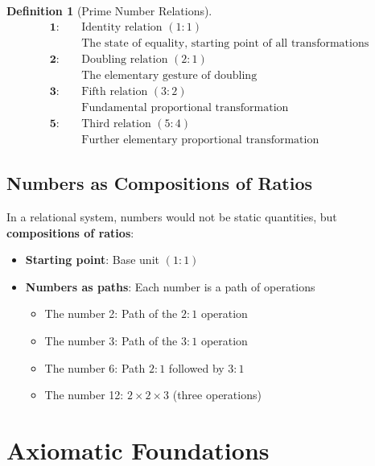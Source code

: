\documentclass[11pt,a4paper]{article}
\newcommand{\primrel}[1]{\mathbf{#1}}
\newtheorem{definition}{Definition}[section]
\begin{document}
	\begin{definition}[Prime Number Relations]
		\begin{align}
			\primrel{1}: \quad &\text{Identity relation } (1:1) \\
			&\text{The state of equality, starting point of all transformations} \\[0.5em]
			\primrel{2}: \quad &\text{Doubling relation } (2:1) \\
			&\text{The elementary gesture of doubling} \\[0.5em]
			\primrel{3}: \quad &\text{Fifth relation } (3:2) \\
			&\text{Fundamental proportional transformation} \\[0.5em]
			\primrel{5}: \quad &\text{Third relation } (5:4) \\
			&\text{Further elementary proportional transformation}
		\end{align}
	\end{definition}
	
	\subsection{Numbers as Compositions of Ratios}
	
	In a relational system, numbers would not be static quantities, but \textbf{compositions of ratios}:
	
	\begin{itemize}
		\item \textbf{Starting point}: Base unit $(1:1)$
		\item \textbf{Numbers as paths}: Each number is a path of operations
		\begin{itemize}
			\item The number 2: Path of the $2:1$ operation
			\item The number 3: Path of the $3:1$ operation  
			\item The number 6: Path $2:1$ followed by $3:1$
			\item The number 12: $2 \times 2 \times 3$ (three operations)
		\end{itemize}
	\end{itemize}
	
	\section{Axiomatic Foundations}
	
\end{document}
